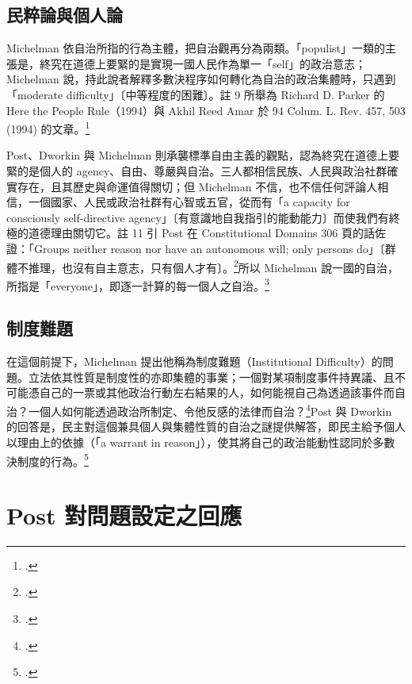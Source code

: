 \subsection{民粹論與個人論}

Michelman 依自治所指的行為主體，把自治觀再分為兩類。「populist」一類的主張是，終究在道德上要緊的是實現一國人民作為單一「self」的政治意志；Michelman 說，持此說者解釋多數決程序如何轉化為自治的政治集體時，只遇到「moderate difficulty」〔中等程度的困難〕。註 9 所舉為 Richard D. Parker 的 Here the People Rule（1994）與 Akhil Reed Amar 於 94 Colum. L. Rev. 457, 503 (1994) 的文章。\footcite[402--403 \& n.9]{michelman1998}

Post、Dworkin 與 Michelman 則承襲標準自由主義的觀點，認為終究在道德上要緊的是個人的 agency、自由、尊嚴與自治。三人都相信民族、人民與政治社群確實存在，且其歷史與命運值得關切；但 Michelman 不信，也不信任何評論人相信，一個國家、人民或政治社群有心智或五官，從而有「a capacity for consciously self-directive agency」〔有意識地自我指引的能動能力〕而使我們有終極的道德理由關切它。註 11 引 Post 在 Constitutional Domains 306 頁的話佐證：「Groups neither reason nor have an autonomous will; only persons do」〔群體不推理，也沒有自主意志，只有個人才有〕。\footcite[403 \& nn.10--11]{michelman1998}所以 Michelman 說一國的自治，所指是「everyone」，即逐一計算的每一個人之自治。\footcite[403]{michelman1998}

\subsection{制度難題}

在這個前提下，Michelman 提出他稱為制度難題（Institutional Difficulty）的問題。立法依其性質是制度性的亦即集體的事業；一個對某項制度事件持異議、且不可能憑自己的一票或其他政治行動左右結果的人，如何能視自己為透過該事件而自治？一個人如何能透過政治所制定、令他反感的法律而自治？\footcite[403]{michelman1998}Post 與 Dworkin 的回答是，民主對這個兼具個人與集體性質的自治之謎提供解答，即民主給予個人以理由上的依據（「a warrant in reason」），使其將自己的政治能動性認同於多數決制度的行為。\footcite[403]{michelman1998}

\section{Post 對問題設定之回應}
\label{sec:10_problem-6}

